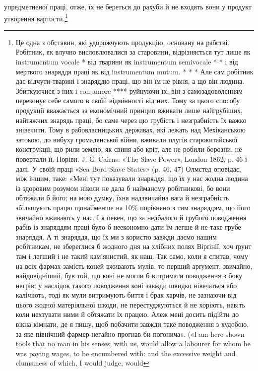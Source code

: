 \parcont{}  %
упредметненої праці, отже, їх не береться до рахуби й не входять
вони у продукт утворення вартости.\footnote{
Це одна з обставин, які удорожчують продукцію, основану на
рабстві. Робітник, як влучно висловлювалися за старовини, відрізняється
тут лише як instrumentum vocale * від тварини як instrumentum semivocale
* * і від мертвого знаряддя праці як від instrumentum mutum. * * *
Але сам робітник дає відчути тварині і знаряддю праці, що він їм не
рівня, а що він людина. Збиткуючися з них і con amore **** руйнуючи їх,
він з самозадоволенням переконує себе самого в своїй відмінності від них.
Тому за цього способу продукції вважається за економічний принцип
вживати лише найгрубіших, найтяжчих знарядь праці, бо саме через
цю грубість і незграбність їх важко знівечити. Тому в рабовласницьких
державах, які лежать над Мехіканською затокою, до вибуху громадянської
війни, вживали плугів старокитайської конструкції, що рили землю,
як свиня або кріт, але не робили борозни, не повертали її. Порівн.
J. С. Cairns: «The Slave Power», London 1862, p. 46 і далі. У своїй праці
«Sea Bord Slave States» (p. 46, 47) Олмстед оповідає, між іншим, таке:
«Мені тут показували знаряддя, що їх у нас жодна людина із здоровим
розумом ніколи не дала б найманому робітникові, бо вони обтяжали б
його; на мою думку, їхня надзвичайна вага й незграбність збільшують
працю щонайменше на 10\% порівняно з тим знаряддям, що його звичайно
вживають у нас. І я певен, що за недбалого й грубого поводження рабів
із знаряддям праці було б неекономно дати їм легше й не таке грубе знаряддя.
А ті знаряддя, що їх ми з користю завжди даємо нашим робітникам,
не збереглися б жодного дня на хлібних полях Вірґінії, хоч ґрунт там
і легший і не такий кам’янистий, як наш. Так само, коли я спитав, чому
на всіх фармах замість коней вживають мулів, то перший арґумент, звичайно,
найдовідніший, був той, що коні не могли б витримати поводження
з боку негрів; у наслідок такого поводження коні завжди швидко нівечаться
або калічіють, тоді як мули витримують биття і брак харчів, не
зазнаючи від цього жодної матеріяльної шкоди, не перестуджуються й не
хоріють, навіть коли нехтувати ними й обтяжати їх працею. Алеж мені
досить підійти до вікна кімнати, де я пишу, щоб побачити завжди таке
поводження з худобою, за яке північний фармер негайно прогнав би погонича».
(«І am here shown tools that no man in his senses, with us, would
allow a labourer for whom he was paying wages, to be encumbered with:
and the excessive weight and clumsiness of which, I would judge, would
}
